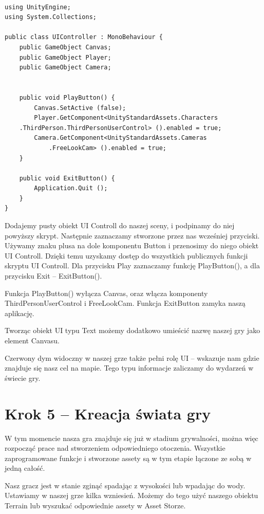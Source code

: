 \documentclass[openright]{xmgr}
\begin{document}
\begin{lstlisting}

using UnityEngine;
using System.Collections;

public class UIController : MonoBehaviour {
    public GameObject Canvas;
    public GameObject Player;
    public GameObject Camera;


    public void PlayButton() {
        Canvas.SetActive (false);
        Player.GetComponent<UnityStandardAssets.Characters
	.ThirdPerson.ThirdPersonUserControl> ().enabled = true;
        Camera.GetComponent<UnityStandardAssets.Cameras
			.FreeLookCam> ().enabled = true;
    }

    public void ExitButton() {
        Application.Quit ();
    }
}

\end{lstlisting}

Dodajemy pusty obiekt UI Controll do naszej sceny, i podpinamy do niej powyższy skrypt. Następnie zaznaczamy stworzone przez nas wcześniej przyciski. Używamy znaku plusa na dole komponentu Button i przenosimy do niego obiekt UI Controll. Dzięki temu uzyskamy dostęp do wszystkich publicznych funkcji skryptu UI Controll. Dla przycisku Play zaznaczamy funkcję PlayButton(), a dla przycisku Exit – ExitButton().

Funkcja PlayButton() wyłącza Canvas, oraz włącza komponenty ThirdPersonUserControl i FreeLookCam. Funkcja ExitButton zamyka naszą aplikację.

Tworząc obiekt UI typu Text możemy dodatkowo umieścić nazwę naszej gry jako element Canvasu.

Czerwony dym widoczny w naszej grze także pełni rolę UI – wskazuje nam gdzie znajduje się nasz cel na mapie. Tego typu informacje zaliczamy do wydarzeń w świecie gry.

\section{Krok 5 – Kreacja świata gry}

W tym momencie nasza gra znajduje się już w stadium grywalności, można więc rozpocząć prace nad stworzeniem odpowiedniego otoczenia. Wszystkie zaprogramowane funkcje i stworzone assety są w tym etapie łączone ze sobą w jedną całość.

Nasz gracz jest  w stanie zginąć spadając z wysokości lub wpadając do wody. Ustawiamy w naszej grze kilka wzniesień. Możemy do tego użyć naszego obiektu Terrain lub wyszukać odpowiednie assety w Asset Storze.
\end{document}
